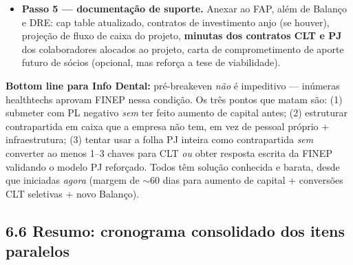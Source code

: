 \documentclass[11pt, a4paper]{article}
\newcommand{\destaque}[2]{%
    \vspace{2pt}
    \colorbox{#1!10}{%
        \parbox{\dimexpr\textwidth-2\fboxsep}{%
            \small #2%
        }%
    }
    \vspace{4pt}
}
\begin{document}
\begin{itemize}[label=\textcolor{accentColor}{$\blacktriangleright$}, leftmargin=1.6em]
\begin{itemize}[label=$\circ$, leftmargin=1.4em]
        \item \textbf{(b) Modelagem PJ reforçada} + consulta formal escrita à FINEP --- risco controlado se houver resposta documentada antes da submissão.
        \item \textbf{(c) Contrapartida via infraestrutura dedicada} (servidores GPU, licenças de software, equipamentos): pode somar R\$ 100--200 k em 36 meses, complementando o pessoal e reduzindo a pressão sobre a folha.
        \item \textbf{Estrutura recomendada Info Dental:} 2 CLT seniores ($\sim$R\$ 15 k/mês cada $\Rightarrow$ $\sim$R\$ 540 k em folha bruta em 36 meses) + restante do time como PJ na rubrica Serviços de Terceiros (paga pelo FINEP) + infra GPU complementar. Cobre folgadamente os R\$ 250 k de contrapartida.
    \end{itemize}
    \item \textbf{Passo 5 --- documentação de suporte.} Anexar ao FAP, além de Balanço e DRE: cap table atualizado, contratos de investimento anjo (se houver), projeção de fluxo de caixa do projeto, \textbf{minutas dos contratos CLT e PJ} dos colaboradores alocados ao projeto, carta de comprometimento de aporte futuro de sócios (opcional, mas reforça a tese de viabilidade).
\end{itemize}

\destaque{successGreen}{%
    \textcolor{successGreen}{\textbf{Bottom line para Info Dental:}} pré-breakeven \emph{não} é impeditivo --- inúmeras healthtechs aprovam FINEP nessa condição. Os três pontos que matam são: (1) submeter com PL negativo \emph{sem} ter feito aumento de capital antes; (2) estruturar contrapartida em caixa que a empresa não tem, em vez de pessoal próprio + infraestrutura; (3) tentar usar a folha PJ inteira como contrapartida \emph{sem} converter ao menos 1--3 chaves para CLT \emph{ou} obter resposta escrita da FINEP validando o modelo PJ reforçado. Todos têm solução conhecida e barata, desde que iniciadas \emph{agora} (margem de $\sim$60 dias para aumento de capital + conversões CLT seletivas + novo Balanço).%
}

\subsection{6.6 Resumo: cronograma consolidado dos itens paralelos}
\end{document}
